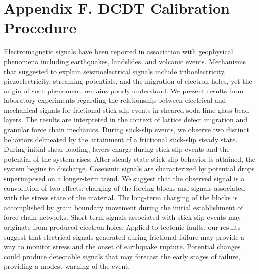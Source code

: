 \chapter*{Appendix F. DCDT Calibration Procedure}
Electromagnetic signals have been reported in association with geophysical phenomena including earthquakes, landslides, and volcanic events. Mechanisms that suggested to explain seismoelectrical signals include triboelectricity, piezoelectricity, streaming potentials, and the migration
of electron holes, yet the origin of such phenomena remains poorly understood. We present results from laboratory experiments regarding the relationship between electrical and mechanical signals for frictional stick-slip events in sheared soda-lime glass bead layers. The results are interpreted in the context of lattice defect migration and granular force chain mechanics. During stick-slip events, we observe two distinct behaviors delineated by the attainment of a frictional stick-slip steady state. During initial shear loading, layers charge during stick-slip events and the potential of the system rises. After steady state stick-slip behavior is attained, the system begins to discharge. Coseismic signals are characterized by potential drops superimposed on a longer-term trend. We suggest that the observed signal is a convolution of two effects: charging of the forcing blocks and signals associated with the stress state of the material. The long-term charging of the blocks is accomplished by grain boundary movement during the initial establishment of force chain networks. Short-term signals associated with stick-slip events may originate from produced electron holes. Applied to tectonic faults, our results suggest that electrical signals generated during frictional failure may provide a way to monitor stress and the onset of earthquake rupture. Potential changes could produce detectable signals that may forecast the early stages of failure, providing a modest warning of the event.
